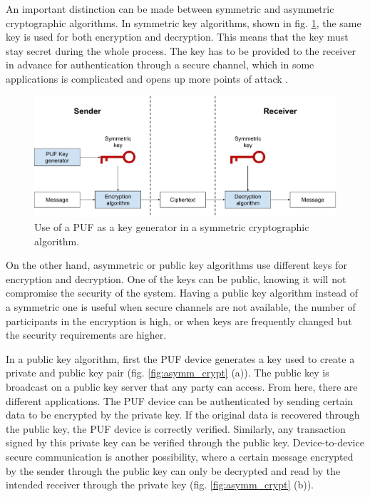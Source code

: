An important distinction can be made between symmetric and asymmetric cryptographic algorithms. In symmetric key algorithms, shown in fig. \ref{fig:symm_crypt}, the same key is used for both encryption and decryption. This means that the key must stay secret during the whole process. The key has to be provided to the receiver in advance for authentication through a secure channel, which in some applications is complicated and opens up more points of attack \cite{Gao2020}.

\begin{figure}[t]
    \centering
    \includegraphics[width=14cm]{images/Symmetric key generation.pdf}
    \caption{Use of a PUF as a key generator in a symmetric cryptographic algorithm.}
    \label{fig:symm_crypt}
\end{figure}


On the other hand, asymmetric or public key algorithms use different keys for encryption and decryption. One of the keys can be public, knowing it will not compromise the security of the system. Having a public key algorithm instead of a symmetric one is useful when secure channels are not available, the number of participants in the encryption is high, or when keys are frequently changed but the security requirements are higher. 

In a public key algorithm, first the PUF device generates a key used to create a private and public key pair (fig. \ref{fig:asymm_crypt} (a)). The public key is broadcast on a public key server that any party can access. From here, there are different applications. The PUF device can be authenticated by sending certain data to be encrypted by the private key. If the original data is recovered through the public key, the PUF device is correctly verified. Similarly, any transaction signed by this private key can be verified through the public key. Device-to-device secure communication is another possibility, where a certain message encrypted by the sender through the public key can only be decrypted and read by the intended receiver through the private key (fig. \ref{fig:asymm_crypt} (b)).




